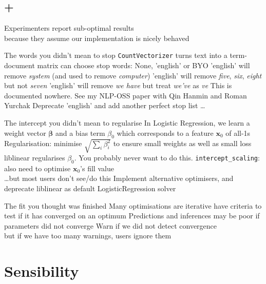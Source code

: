 \documentclass[aspectratio=169, 22pt]{beamer}
\newcommand{\hl}{\textcolor{usydred}}
\newenvironment{sectionslide}
			{\subsection*{+}\begin{frame}[fragile,environment=sectionslide]\vfill\begin{center}\Large}
			{\end{center}\vfill\end{frame}}
\begin{document}
\begin{sectionslide}
	Experimenters report sub-optimal results\\
	because they assume our implementation is nicely behaved
\end{sectionslide}

\begin{points}{The words you didn't mean to stop}
	\p \verb|CountVectorizer| turns text into a term-document matrix
	\p can choose stop words: None, 'english' or BYO
	\p 'english' will remove \emph{system} (and used to remove \emph{computer})
	\p 'english' will remove \emph{five}, \emph{six}, \emph{eight} but not \emph{seven}
	\p 'english' will remove \emph{we have} but treat \emph{we've} as \emph{ve}
	\p This is documented nowhere.
	\p See my NLP-OSS paper with Qin Hanmin and Roman Yurchak
	\pause
	\p[Solution] Deprecate 'english' 
	\pause and add another \hl{perfect} stop list \ldots
\end{points}

\begin{points}{The intercept you didn't mean to regularise}
	\p In Logistic Regression, we learn a weight vector $\mathbf{\beta}$
	\p and a bias term $\beta_0$ which corresponds to a feature $\mathbf{x}_0$ of all-1s
	\p Regularisation: minimise $\sqrt{\sum_i \beta_i^2}$ to ensure small weights as well as small loss 
	\p liblinear regularises $\beta_0$. You probably never want to do this.
	\pause
	\p[Sol'n 1] \verb|intercept_scaling|: also need to optimise $\mathbf{x}_0$'s fill value\\
	\pause
	\ldots but most users don't see/do this
	\p[Sol'n 2] Implement alternative optimisers, and deprecate liblinear as default LogisticRegression solver
\end{points}

\begin{points}{The fit you thought was finished}
	\p Many optimisations are iterative
	\p have criteria to test if it has converged on an optimum
	\p Predictions and inferences may be poor if parameters did not converge
	\p[Solution] Warn if we did not detect convergence \\
	but if we have too many warnings, users ignore them
\end{points}

\section{Sensibility}
\end{document}
